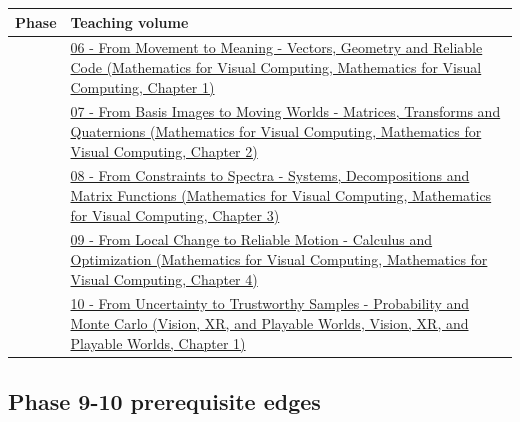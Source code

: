 {\def\LTcaptype{none} %
\begin{longtable}[]{@{}
  >{\raggedright\arraybackslash}p{}
  >{\raggedright\arraybackslash}p{}@{}}
\toprule\noalign{}
\begin{minipage}[b]{\linewidth}\raggedright
Phase
\end{minipage} & \begin{minipage}[b]{\linewidth}\raggedright
Teaching volume
\end{minipage} \\
\midrule\noalign{}
\endhead
\bottomrule\noalign{}
\endlastfoot
6 & \href{../02-Mathematics-for-Visual-Computing/main.pdf\#nameddest=01-foundations-i-ch017-the-panel-gives-us-a-reason-to-learn}{06 - From Movement to Meaning - Vectors, Geometry and Reliable Code (Mathematics for Visual Computing, Mathematics for Visual Computing, Chapter 1)} \\
7 & \href{../02-Mathematics-for-Visual-Computing/main.pdf\#nameddest=01-foundations-i-ch018-keep-the-promises-visible-while-moving-between-representations}{07 - From Basis Images to Moving Worlds - Matrices, Transforms and Quaternions (Mathematics for Visual Computing, Mathematics for Visual Computing, Chapter 2)} \\
8 & \href{../02-Mathematics-for-Visual-Computing/main.pdf\#nameddest=01-foundations-i-ch019-the-graphics-problem-hiding-inside-a-matrix-equation}{08 - From Constraints to Spectra - Systems, Decompositions and Matrix Functions (Mathematics for Visual Computing, Mathematics for Visual Computing, Chapter 3)} \\
9 & \href{../02-Mathematics-for-Visual-Computing/main.pdf\#nameddest=01-foundations-i-ch020-functions-limits-continuity-and-scalar-change}{09 - From Local Change to Reliable Motion - Calculus and Optimization (Mathematics for Visual Computing, Mathematics for Visual Computing, Chapter 4)} \\
10 & \href{../07-Vision-XR-and-Playable-Worlds/main.pdf\#nameddest=02-foundations-ii-ch039-learning-route}{10 - From Uncertainty to Trustworthy Samples - Probability and Monte Carlo (Vision, XR, and Playable Worlds, Vision, XR, and Playable Worlds, Chapter 1)} \\
\end{longtable}
}

\subsection{Phase 9-10 prerequisite edges}\label{appendix-4ad47bdd269a-phase-9-10-prerequisite-edges}


